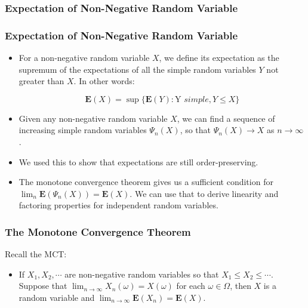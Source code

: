 \documentclass[handout]{beamer}
\newcommand{\BE}{\mathbf{E}}
\begin{document}
\subsubsection{Expectation of Non-Negative Random Variable}


\frame
{
  \frametitle{Expectation of Non-Negative Random Variable}

   \begin{itemize}


\item<1-> For a non-negative random variable $X$, we define its expectation as the supremum of the expectations of all the simple random variables $Y$ not greater than $X$. In other words:
                         
                         $$\BE(X)=\sup\{\BE(Y): \text{Y } simple, Y\leq X\}$$
                         
\item<1-> Given any non-negative random variable $X$, we can find a sequence of increasing simple random variables $\Psi_n(X)$, so that $\Psi_n(X)\rightarrow X$ as $n\rightarrow \infty$.
         
\item<1-> We used this to show that expectations are still order-preserving. 

\item<1-> The monotone convergence theorem gives us a sufficient condition for $\lim_{n}\BE(\Psi_n(X))=\BE(X)$. We can use that to derive linearity and factoring properties for independent random variables.  

                                                                                                                              \end{itemize}
}


\frame
{
\frametitle{The Monotone Convergence Theorem}

Recall the MCT: 

\begin{itemize}

\item<2->[]\begin{Theorem} If $X_1, X_2, \cdots$ are non-negative random variables so that $X_1\leq X_2\leq \cdots $. Suppose that $\lim_{n\rightarrow \infty} X_n(\omega)=X(\omega)$ for each $\omega \in \Omega$, then $X$ is a random variable and $\lim_{n\rightarrow \infty} \BE(X_n)=\BE(X)$. 
                          
\end{Theorem}                           
                                                                                                          

\end{itemize}
}
\end{document}
